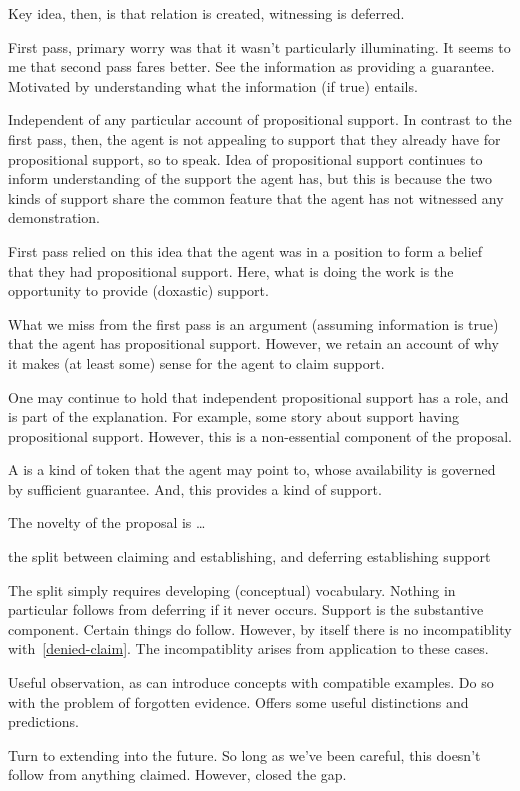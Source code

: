\begin{note}
  Key idea, then, is that relation is created, witnessing is deferred.

  First pass, primary worry was that it wasn't particularly illuminating.
  It seems to me that second pass fares better.
  See the information as providing a guarantee.
  Motivated by understanding what the information (if true) entails.

  Independent of any particular account of propositional support.
  In contrast to the first pass, then, the agent is not appealing to support that they already have for propositional support, so to speak.
  Idea of propositional support continues to inform understanding of the support the agent has, but this is because the two kinds of support share the common feature that the agent has not witnessed any demonstration.

  First pass relied on this idea that the agent was in a position to form a belief that they had propositional support.
  Here, what is doing the work is the opportunity to provide (doxastic) support.

  What we miss from the first pass is an argument (assuming information is true) that the agent has propositional support.
  However, we retain an account of why it makes (at least some) sense for the agent to claim support.

  One may continue to hold that independent propositional support has a role, and is part of the explanation.
  For example, some story about support having propositional support.
  However, this is a non-essential component of the proposal.

  A \future{} is a kind of token that the agent may point to, whose availability is governed by sufficient guarantee.
  And, this provides a kind of support.
\end{note}

\begin{note}[Novelty]
  The novelty of the proposal is \dots

  the split between claiming and establishing, and deferring establishing
  support

  The split simply requires developing (conceptual) vocabulary.
  Nothing in particular follows from deferring if it never occurs.
  Support is the substantive component.
  Certain things do follow.
  However, by itself there is no incompatiblity with~\ref{denied-claim}.
  The incompatiblity arises from application to these cases.

  Useful observation, as can introduce concepts with compatible examples.
  Do so with the problem of forgotten evidence.
  Offers some useful distinctions and predictions.

  Turn to extending into the future.
  So long as we've been careful, this doesn't follow from anything claimed.
  However, closed the gap.
\end{note}

